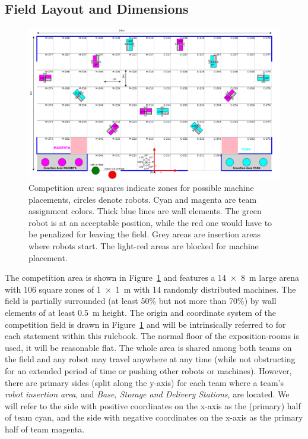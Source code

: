 \documentclass[12pt,twoside]{article}
\newcommand{\reffig}[1]{Figure~\ref{#1}}
\begin{document}
\subsection{Field Layout and Dimensions}
\label{sec:competition-area}
\begin{figure}[p]
    \includegraphics[width=\paperwidth, angle=-90 , trim = 0 0 0 0,]{field2017.pdf}
    \vspace{1ex}
    \caption{Competition area: squares indicate zones for possible machine
        placements, circles denote robots. Cyan and magenta are team
        assignment colors. Thick blue lines are wall elements. The green 
        robot is at an
        acceptable position, while the red one would have to be penalized
        for leaving the field. Grey areas are insertion areas where robots
        start. The light-red areas are blocked for machine placement.}
    \label{fig:competition-area}
\end{figure}
The competition area is shown in \reffig{fig:competition-area} and
features a \SI{14 x 8}{\metre} large arena with 106 square zones
of \SI{1 x 1}{\metre} with 14 randomly distributed machines. The
field is partially surrounded (at least 50\% but not more than 70\%)
by wall elements of at least \SI{0.5}{\metre} height.  The origin and
coordinate system of the competition field is drawn in
\reffig{fig:competition-area} and will be intrinsically referred to
for each statement within this rulebook. The normal floor of the
exposition-rooms is used, it will be reasonable flat. The whole area
is shared among both teams on the field and any robot may travel
anywhere at any time (while not obstructing for an extended period of
time or pushing other robots or machines). However, there are primary
sides (split along the y-axis) for each team where a team's
\textit{robot insertion area}, and \textit{Base, Storage and Delivery
  Stations}, are located. We will refer to the side with positive
coordinates on the x-axis as the (primary) half of team cyan, and the
side with negative coordinates on the x-axis as the primary half of
team magenta.
\end{document}
